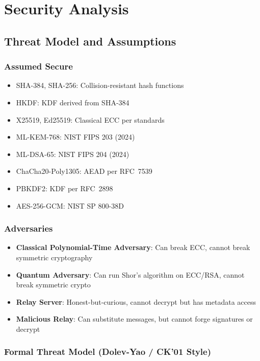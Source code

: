 \documentclass[11pt,a4paper,oneside]{article}
\begin{document}
\section{Security Analysis}

\subsection{Threat Model and Assumptions}

\subsubsection{Assumed Secure}
\begin{itemize}
\item SHA-384, SHA-256: Collision-resistant hash functions
\item HKDF: KDF derived from SHA-384
\item X25519, Ed25519: Classical ECC per standards
\item ML-KEM-768: NIST FIPS 203 (2024)
\item ML-DSA-65: NIST FIPS 204 (2024)
\item ChaCha20-Poly1305: AEAD per RFC~7539
\item PBKDF2: KDF per RFC~2898
\item AES-256-GCM: NIST SP 800-38D
\end{itemize}

\subsubsection{Adversaries}
\begin{itemize}
\item \textbf{Classical Polynomial-Time Adversary}: Can break ECC, cannot break symmetric cryptography
\item \textbf{Quantum Adversary}: Can run Shor's algorithm on ECC/RSA, cannot break symmetric crypto
\item \textbf{Relay Server}: Honest-but-curious, cannot decrypt but has metadata access
\item \textbf{Malicious Relay}: Can substitute messages, but cannot forge signatures or decrypt
\end{itemize}

\subsubsection{Formal Threat Model (Dolev-Yao / CK'01 Style)}
\end{document}
